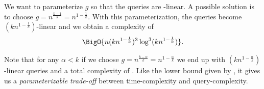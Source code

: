We want to parameterize \(g\) so that the queries are -linear. A
possible solution is to choose \(g = n^{\frac{k-1}{k}} = n^{1-\frac{1}{k}}\).
With this parameterization, the queries become \((kn^{1-\frac{1}{k}})\)-linear
and we obtain a complexity of
\begin{displaymath}
\BigO{n (kn^{1-\frac{1}{k}})^3 \log^3 (kn^{1-\frac{1}{k}}) }.
\end{displaymath}

Note that for any \(\alpha < k\) if we choose \(g = n^{\frac{k-\alpha}{k}} =
n^{1-\frac{\alpha}{k}}\) we end up with \((kn^{1-\frac{\alpha}{k}})\)-linear
queries and a total complexity of
.
Like the lower bound given by \citet*{ailon:2005}, it gives us a \emph{parameterizable
trade-off} between time-complexity and query-complexity.
